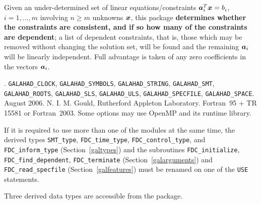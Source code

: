 \documentclass{galahad}
\newcommand{\packagename}{FDC}
\newcommand{\fullpackagename}{\libraryname\_\-\packagename}
\begin{document}
\galheader


\galsummary
Given an under-determined set of linear equations/constraints
${\bm{a}}_i^T {\bm{x}} = b_i^{}$,
$i = 1, \ldots, m$ involving $n \geq m$ unknowns ${\bm{x}}$, this package
{\bf determines whether the constraints are consistent, and if so how many
of the constraints are dependent}; a list of dependent constraints, that
is, those which may be removed without changing the solution set, will be found
and the remaining ${\bm{a}}_i$ will be linearly independent.
Full advantage is taken of any zero coefficients in the vectors ${\bm{a}}_i$.


\galattributes
\galversions{\tt  \fullpackagename\_single, \fullpackagename\_double}.
\galuses
{\tt GALAHAD\_\-CLOCK},
{\tt GALAHAD\_SY\-M\-BOLS}, {\tt GALAHAD\_\-STRING},
{\tt GALAHAD\_SMT}, {\tt GALAHAD\_\-ROOTS}, {\tt GALAHAD\_\-SLS},
{\tt GALAHAD\_\-ULS}, {\tt GALAHAD\_SPECFILE}, {\tt GALAHAD\-\_SPACE}.
\galdate August  2006.
\galorigin N. I. M. Gould, Rutherford Appleton Laboratory.
\gallanguage Fortran~95 + TR 15581 or Fortran~2003.
\galparallelism Some options may use OpenMP and its runtime library.


\galhowto



\noindent
If it is required to use more than one of the modules at the same time, 
the derived types
{\tt SMT\_type},
{\tt \packagename\_time\_type},
{\tt \packagename\_control\_type},
and
{\tt \packagename\_inform\_type}
(Section~\ref{galtypes})
and the subroutines
{\tt \packagename\_initialize},
{\tt \packagename\_\-find\_dependent},
{\tt \packagename\_terminate}
(Section~\ref{galarguments})
and
{\tt \packagename\_read\_specfile}
(Section~\ref{galfeatures})
must be renamed on one of the {\tt USE} statements.








\galtypes
Three derived data types are accessible from the package.
\end{document}
